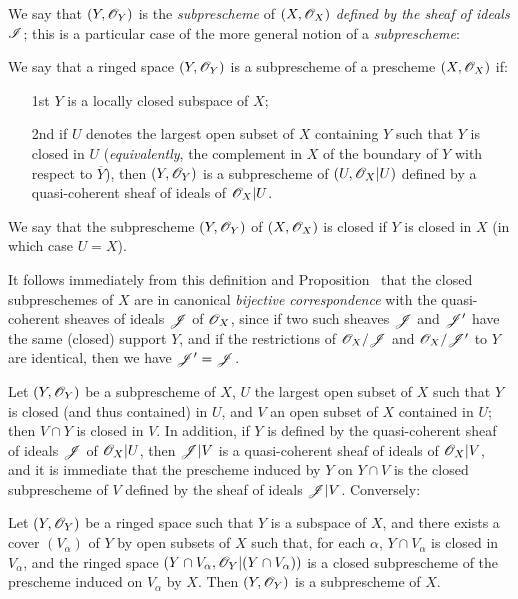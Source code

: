 We say that $(Y,\mathscr{O}_Y)$ is the \emph{subprescheme} of $(X,\mathscr{O}_X)$ \emph{defined by the sheaf of ideals $\mathscr{I}$};
this is a particular case of the more general notion of a \emph{subprescheme}:

\begin{defn}[4.1.3]
\label{1.4.1.3}
We say that a ringed space $(Y,\mathscr{O}_Y)$ is a subprescheme of a prescheme $(X,\mathscr{O}_X)$ if:
\begin{enumerate}
  \item[1st] $Y$ is a locally closed subspace of $X$;
  \item[2nd] if $U$ denotes the largest open subset of $X$ containing $Y$ such that $Y$ is closed in $U$ (\emph{equivalently}, the complement in $X$ of the boundary of $Y$ with respect to $\overline{Y}$), then $(Y,\mathscr{O}_Y)$ is a subprescheme of $(U,\mathscr{O}_X|U)$ defined by a quasi-coherent sheaf of ideals of $\mathscr{O}_X|U$.
\end{enumerate}
We say that the subprescheme $(Y,\mathscr{O}_Y)$ of $(X,\mathscr{O}_X)$ is closed if $Y$ is closed in $X$ (in which case $U=X$).
\end{defn}

It follows immediately from this definition and Proposition~ that the closed subpreschemes of $X$ are in canonical \emph{bijective correspondence} with the quasi-coherent sheaves of ideals $\mathscr{J}$ of $\mathscr{O}_X$, since if two such sheaves $\mathscr{J}$ and $\mathscr{J}'$ have the same (closed) support $Y$, and if the restrictions of $\mathscr{O}_X/\mathscr{J}$ and $\mathscr{O}_X/\mathscr{J}'$ to $Y$ are identical, then we have $\mathscr{J}'=\mathscr{J}$.

\begin{env}[4.1.4]
\label{1.4.1.4}
Let $(Y,\mathscr{O}_Y)$ be a subprescheme of $X$, $U$ the largest open subset of $X$ such that $Y$ is closed (and thus contained) in $U$, and $V$ an open subset of $X$ contained in $U$;
then $V\cap Y$ is closed in $V$.
In addition, if $Y$ is defined by the quasi-coherent sheaf of ideals $\mathscr{J}$ of $\mathscr{O}_X|U$, then $\mathscr{J}|V$ is a quasi-coherent sheaf of ideals of $\mathscr{O}_X|V$, and it is immediate that the prescheme induced by $Y$ on $Y\cap V$ is the closed subprescheme of $V$ defined by the sheaf of ideals $\mathscr{J}|V$.
Conversely:
\end{env}

\begin{prop}[4.1.5]
\label{1.4.1.5}
Let $(Y,\mathscr{O}_Y)$ be a ringed space such that $Y$ is a subspace of $X$, and there exists a cover $(V_\alpha)$ of $Y$ by open subsets of $X$ such that, for each $\alpha$, $Y\cap V_\alpha$ is closed in $V_\alpha$, and the ringed space $(Y\cap V_\alpha,\mathscr{O}_Y|(Y\cap V_\alpha))$ is a closed subprescheme of the prescheme induced on $V_\alpha$ by $X$.
Then $(Y,\mathscr{O}_Y)$ is a subprescheme of $X$.
\end{prop}

